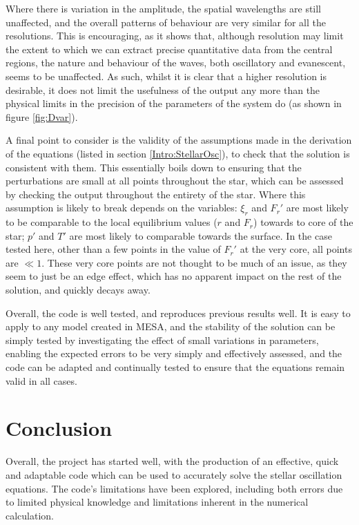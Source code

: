 \documentclass[11pt]{amsart}
\begin{document}
Where there is variation in the amplitude, the spatial wavelengths are still unaffected, and the overall patterns of behaviour are very similar for all the resolutions.  This is encouraging, as it shows that, although resolution may limit the extent to which we can extract precise quantitative data from the central regions, the nature and behaviour of the waves, both oscillatory and evanescent, seems to be unaffected.  As such, whilst it is clear that a higher resolution is desirable, it does not limit the usefulness of the output any more than the physical limits in the precision of the parameters of the system do (as shown in figure \ref{fig:Dvar}).


A final point to consider is the validity of the assumptions made in the derivation of the equations (listed in section \ref{Intro:StellarOsc}), to check that the solution is consistent with them.  This essentially boils down to ensuring that the perturbations are small at all points throughout the star, which can be assessed by checking the output throughout the entirety of the star.  Where this assumption is likely to break depends on the variables: $\xi_{r}$ and $F_{r}'$ are most likely to be comparable to the local equilibrium values ($r$ and $F_{r}$) towards to core of the star; $p'$ and $T'$ are most likely to comparable towards the surface.  In the case tested here, other than a few points in the value of $F_{r}'$ at the very core, all points are $\ll 1$.  These very core points are not thought to be much of an issue, as they seem to just be an edge effect, which has no apparent impact on the rest of the solution, and quickly decays away.



Overall, the code is well tested, and reproduces previous results well.  It is easy to apply to any model created in MESA, and the stability of the solution can be simply tested by investigating the effect of small variations in parameters, enabling the expected errors to be very simply and effectively assessed, and the code can be adapted and continually tested to ensure that the equations remain valid in all cases.






\section{Conclusion} \label{Conc}


Overall, the project has started well, with the production of an effective, quick and adaptable code which can be used to accurately solve the stellar oscillation equations.  The code's limitations have been explored, including both errors due to limited physical knowledge and limitations inherent in the numerical calculation.
\end{document}

